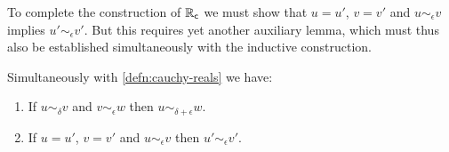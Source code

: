 To complete the construction of $\mathbb{R}_\mathsf{c}$ we must show that $u = u'$, $v = v'$ and $u
\sim_\epsilon v$ implies $u' \sim_\epsilon v'$. But this requires yet another auxiliary
lemma, which must thus also be established simultaneously with the inductive construction.

\begin{lem}\label{lem:RC-well-defined}
  Simultaneously with \autoref{defn:cauchy-reals} we have:
  \begin{enumerate}
  \item \label{RC-well-defined-i}
    If $u \sim_\delta v$ and $v \sim_\epsilon w$ then $u \sim_{\delta + \epsilon} w$.
  \item \label{RC-well-defined-ii}
    If $u = u'$, $v = v'$ and $u \sim_\epsilon v$ then $u' \sim_\epsilon v'$.
  \end{enumerate}
\end{lem}

